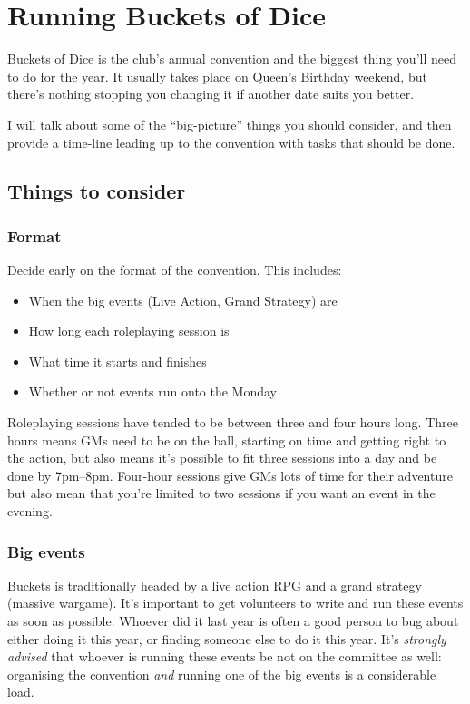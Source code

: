 \section{Running Buckets of Dice}
\label{sec:buckets_of_dice}

Buckets of Dice is the club's annual convention and the biggest thing you'll need to do for the year. It usually takes place on Queen's Birthday weekend, but there's nothing stopping you changing it if another date suits you better.

I will talk about some of the ``big-picture'' things you should consider, and then provide a time-line leading up to the convention with tasks that should be done.

\subsection{Things to consider}

\subsubsection{Format}

Decide early on the format of the convention. This includes:

\begin{itemize}
  \item When the big events (Live Action, Grand Strategy) are
  \item How long each roleplaying session is
  \item What time it starts and finishes
  \item Whether or not events run onto the Monday
\end{itemize}

Roleplaying sessions have tended to be between three and four hours long. Three hours means GMs need to be on the ball, starting on time and getting right to the action, but also means it's possible to fit three sessions into a day and be done by 7pm--8pm. Four-hour sessions give GMs lots of time for their adventure but also mean that you're limited to two sessions if you want an event in the evening.

\subsubsection{Big events}

Buckets is traditionally headed by a live action RPG and a grand strategy (massive wargame). It's important to get volunteers to write and run these events as soon as possible. Whoever did it last year is often a good person to bug about either doing it this year, or finding someone else to do it this year. It's \textit{strongly advised} that whoever is running these events be not on the committee as well: organising the convention \textit{and} running one of the big events is a considerable load.

